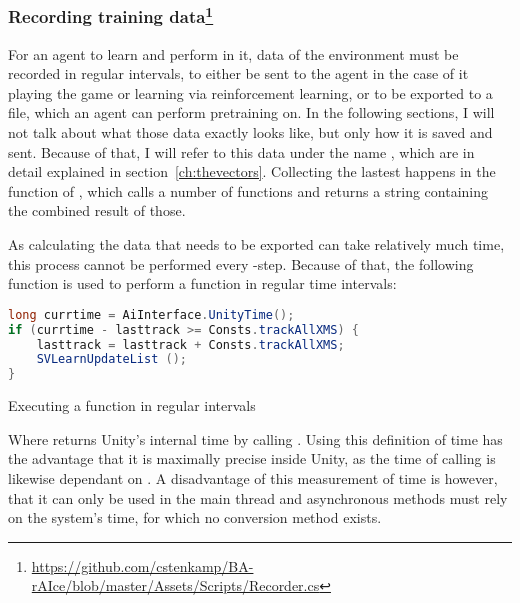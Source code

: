 \subsubsection{Recording training data\footnote{\url{https://github.com/cstenkamp/BA-rAIce/blob/master/Assets/Scripts/Recorder.cs}}}

\label{sec:exportdata}

For an agent to learn and perform in it, data of the environment must be recorded in regular intervals, to either be sent to the agent in the case of it playing the game or learning via reinforcement learning, or to be exported to a file, which an agent can perform pretraining on. In the following sections, I will not talk about what those data exactly looks like, but only how it is saved and sent. Because of that, I will refer to this data under the name , which are in detail explained in section~\ref{ch:thevectors}. Collecting the lastest  happens in the function  of , which calls a number of functions and returns a string containing the combined result of those.

As calculating the data that needs to be exported can take relatively much time, this process cannot be performed every -step. Because of that, the following function is used to perform a function in regular time intervals:
\begin{algorithm}[h]
\begin{lstlisting}[language=C#, style=CSharp, frame=none]
long currtime = AiInterface.UnityTime();
if (currtime - lasttrack >= Consts.trackAllXMS) {
	lasttrack = lasttrack + Consts.trackAllXMS; 
	SVLearnUpdateList ();
}
\end{lstlisting}%
\caption{Executing a function in regular intervals}
\label{alg:everyxseconds}
\end{algorithm}

Where  returns Unity's internal time by calling . Using this definition of time has the advantage that it is maximally precise inside Unity, as the time of calling  is likewise dependant on . A disadvantage of this measurement of time is however, that it can only be used in the main thread and asynchronous methods must rely on the system's time, for which no conversion method exists.

